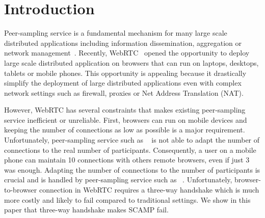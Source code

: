 
\section{Introduction}

Peer-sampling service is a fundamental mechanism for many large scale
distributed applications including information dissemination,
aggregation or network management~\cite{jelasity2007gossip}. Recently,
WebRTC~\cite{webrtc} opened the opportunity to deploy large scale
distributed application on browsers that can run on laptops, desktops,
tablets or mobile phones. This opportunity is appealing because it
drastically simplify the deployment of large distributed applications
even with complex network settings such as firewall, proxies or Net
Address Translation (NAT).


However, WebRTC has several constraints that makes existing
peer-sampling service inefficient or unreliable. First, browsers can
run on mobile devices and keeping the number of connections as low as
possible is a major requirement. Unfortunately, peer-sampling service
such as \CYCLON{}~\cite{ voulgaris2005cyclon} is not able to adapt the
number of connections to the real number of
participants. Consequently, a user on a mobile phone can maintain 10
connections with others remote browsers, even if just 3 was
enough. Adapting the number of connections to the number of
participants is crucial and is handled by peer-sampling service such
as \SCAMP{}~\cite{ganesh2003peer}. Unfortunately, browser-to-browser connection
in WebRTC requires a three-way handshake which is much more costly and
likely to fail compared to traditional settings. We show in this paper
that three-way handshake makes SCAMP fail. 


